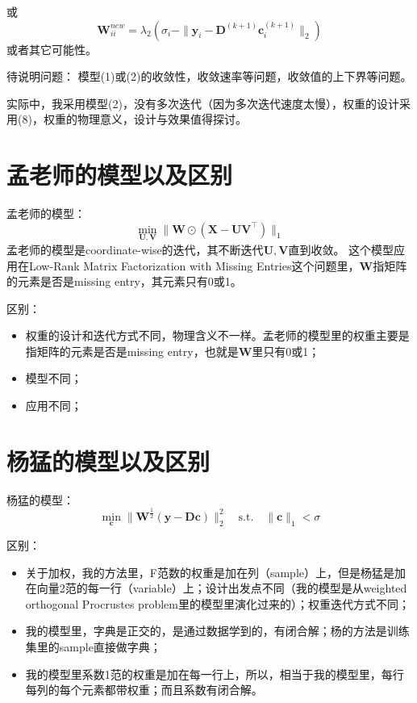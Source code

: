 \documentclass[10pt,twocolumn,letterpaper]{article}
\begin{document}
或
\begin{equation}
\mathbf{W}_{ii}^{new}=\lambda_{2}(\sigma_{i}-\|\mathbf{y}_{i}-\mathbf{D}^{(k+1)}\mathbf{c}_{i}^{(k+1)}\|_{2})
\end{equation}
或者其它可能性。

待说明问题：
模型(1)或(2)的收敛性，收敛速率等问题，收敛值的上下界等问题。

实际中，我采用模型(2)，没有多次迭代（因为多次迭代速度太慢），权重的设计采用(8)，权重的物理意义，设计与效果值得探讨。

\section{孟老师的模型以及区别}
孟老师的模型：
\begin{equation}
\min_{\mathbf{U},\mathbf{V}}\|\mathbf{W}\odot(\mathbf{X}-\mathbf{U}\mathbf{V}^{\top})\|_{1}
\end{equation}
孟老师的模型是coordinate-wise的迭代，其不断迭代$\mathbf{U},\mathbf{V}$直到收敛。
这个模型应用在Low-Rank Matrix Factorization with Missing Entries这个问题里，$\mathbf{W}$指矩阵的元素是否是missing entry，其元素只有0或1。

区别：
\begin{itemize}
\item 权重的设计和迭代方式不同，物理含义不一样。孟老师的模型里的权重主要是指矩阵的元素是否是missing entry，也就是$\mathbf{W}$里只有0或1；
\item 模型不同；
\item 应用不同；
\end{itemize}

\section{杨猛的模型以及区别}
杨猛的模型：
\begin{equation}
\min_{\mathbf{c}}\|\mathbf{W}^{\frac{1}{2}}(\mathbf{y}-\mathbf{D}\mathbf{c})\|_{2}^{2}
\quad
\text{s.t.}
\quad
\|\mathbf{c}\|_{1}<\sigma
\end{equation}

区别：
\begin{itemize}
\item 关于加权，我的方法里，F范数的权重是加在列（sample）上，但是杨猛是加在向量2范的每一行（variable）上；设计出发点不同（我的模型是从weighted orthogonal Procrustes problem里的模型里演化过来的）；权重迭代方式不同；
\item 我的模型里，字典是正交的，是通过数据学到的，有闭合解；杨的方法是训练集里的sample直接做字典；
\item 我的模型里系数1范的权重是加在每一行上，所以，相当于我的模型里，每行每列的每个元素都带权重；而且系数有闭合解。
\end{itemize}



{\small


}
\end{document}
